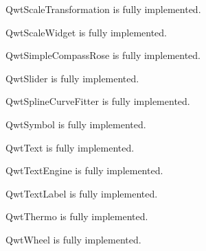 \documentclass{manual}
\begin{document}
\begin{classdesc*}{QwtScaleTransformation}
  is fully implemented.
\end{classdesc*}

\begin{classdesc*}{QwtScaleWidget}
  is fully implemented.
\end{classdesc*}

\begin{classdesc*}{QwtSimpleCompassRose}
  is fully implemented.
\end{classdesc*}

\begin{classdesc*}{QwtSlider}
  is fully implemented.
\end{classdesc*}

\begin{classdesc*}{QwtSplineCurveFitter}
  is fully implemented.
\end{classdesc*}
 
\begin{classdesc*}{QwtSymbol}
  is fully implemented.
\end{classdesc*}

\begin{classdesc*}{QwtText}
  is fully implemented.
\end{classdesc*}

\begin{classdesc*}{QwtTextEngine}
  is fully implemented.
\end{classdesc*}

\begin{classdesc*}{QwtTextLabel}
  is fully implemented.
\end{classdesc*}

\begin{classdesc*}{QwtThermo}
  is fully implemented.
\end{classdesc*}

\begin{classdesc*}{QwtWheel}
  is fully implemented.
\end{classdesc*}


\end{document}
